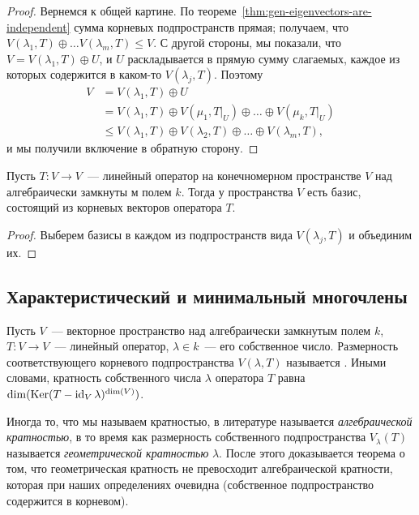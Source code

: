 \begin{proof}
Вернемся к общей картине.
По теореме~\ref{thm:gen-eigenvectors-are-independent}
сумма корневых подпространств прямая; получаем,
что $V(\lambda_1,T)\oplus\dots V(\lambda_m,T)\leq V$.
С другой стороны, мы показали, что $V = V(\lambda_1,T)\oplus U$,
и $U$ раскладывается в прямую сумму слагаемых, каждое из которых
содержится в каком-то $V(\lambda_j,T)$.
Поэтому
\begin{align*}
V &= V(\lambda_1,T)\oplus U \\
&= V(\lambda_1,T)\oplus V(\mu_1,T|_U)\oplus\dots\oplus V(\mu_k,T|_U) \\
&\leq V(\lambda_1,T)\oplus V(\lambda_2,T)\oplus \dots \oplus V(\lambda_m,T),
\end{align*}
и мы получили включение в обратную сторону.
\end{proof}

\begin{corollary}
Пусть $T\colon V\to V$~--- линейный оператор на конечномерном
пространстве $V$ над алгебраически замкнуты м полем $k$.
Тогда у пространства $V$ есть базис, состоящий из корневых векторов
оператора $T$.
\end{corollary}
\begin{proof}
Выберем базисы в каждом из подпространств вида $V(\lambda_j,T)$
и объединим их.
\end{proof}

\subsection{Характеристический и минимальный многочлены}

\begin{definition}
Пусть $V$~--- векторное пространство над алгебраически замкнутым полем $k$,
$T\colon V\to V$~--- линейный оператор, $\lambda\in k$~--- его собственное число.
Размерность соответствующего корневого подпространства $V(\lambda,T)$
называется .
Иными словами, кратность собственного числа $\lambda$ оператора $T$
равна $\dim(\operatorname{Ker}(T-\operatorname{id}_V\lambda)^{\dim(V)})$.
\end{definition}

\begin{remark}
Иногда то, что мы называем кратностью, в литературе называется
{\em алгебраической кратностью}, в то время как размерность собственного подпространства
$V_\lambda(T)$ называется {\em геометрической кратностью} $\lambda$.
После этого доказывается теорема о том, что геометрическая кратность не превосходит
алгебраической кратности, которая при наших определениях очевидна
(собственное подпространство содержится в корневом).
\end{remark}

